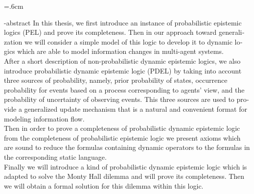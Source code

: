 \baselineskip=.6cm
\begin{latin}
\en-abstract{\noindent
In this thesis, we first introduce an instance of probabilistic epistemic logics (PEL) and prove its completeness. Then in our approach toward generalization we will consider a simple model of this logic to develop it to dynamic logics which are able to model information changes in multi-agent systems.
\\
After a short description of non-probabilistic dynamic epistemic logics, we also introduce probabilistic dynamic epistemic logic (PDEL) by taking into account three sources of probability, namely, prior probability of states, occurrence probability for events based on a process corresponding to agents’ view, and the probability of uncertainty of observing events. This three sources are used to provide a generalized update mechanism that is a natural and convenient format for modeling information flow.
\\
Then in order to prove a completeness of probabilistic dynamic epistemic logic from the completeness of probabilistic epistemic logic we present axioms which are sound to reduce the formulas containing dynamic operators to the formulas in the corresponding static language.
\\
Finally we will introduce a kind of probabilistic dynamic epistemic logic which is adapted to solve the Monty Hall dilemma and will prove its completeness. Then we will obtain a formal solution for this dilemma within this logic.
}
\end{latin}